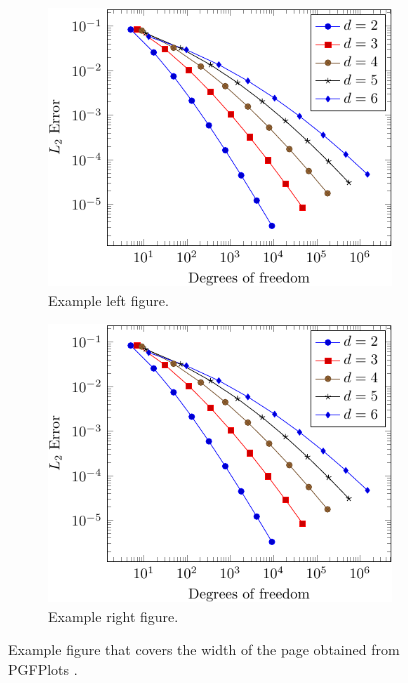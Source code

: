 \documentclass[11pt,proc,twoside]{RMxAC_rho-class/RMxAC_rho}
\begin{document}
        \begin{figure}[ht] %
            \centering
                \begin{subfigure}[b]{0.38\linewidth} %
                    \includegraphics[width=\linewidth]{figures/example2.pdf}
                    \caption{Example left figure.}
                    \label{fig:figa}
                \end{subfigure}
            \hspace{15pt}   %
                \begin{subfigure}[b]{0.38\linewidth} %
                    \centering
                    \includegraphics[width=\linewidth]{figures/example2.pdf}
                    \caption{Example right figure.}
                    \label{fig:figb}
                \end{subfigure}
            \caption{Example figure that covers the width of the page obtained from PGFPlots \cite{PFGPlots}.}
            \label{fig:examplefloat}
        \end{figure}
\end{document}
